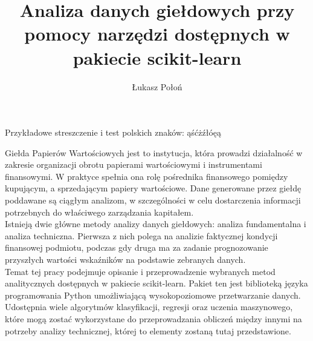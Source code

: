 \documentclass[man,mfi|min|mpt|mok|mub|mza|miz|bsp]{mgrwms}
\begin{document}
\title{Analiza danych giełdowych przy pomocy narzędzi dostępnych w pakiecie scikit-learn}
\author{Łukasz Połoń}
\maketitle
\tableofcontents
\begin{streszczenie}
Przykładowe streszczenie i test polskich znaków: ąśćżźłóęą

%
%
\end{streszczenie}
\begin{abstract}
%
%
\end{abstract}
\begin{wstep}[Wprowadzenie]  %
Giełda Papierów Wartościowych jest to instytucja, która prowadzi działalność w zakresie organizacji obrotu papierami wartościowymi i instrumentami finansowymi\cite{gpw}.
W praktyce spełnia ona rolę pośrednika finansowego pomiędzy kupującym, a sprzedającym papiery wartościowe.
Dane generowane przez giełdę poddawane są ciągłym analizom, w szczególności w celu dostarczenia informacji potrzebnych do właściwego zarządzania kapitałem.\\
Istnieją dwie główne metody analizy danych giełdowych: analiza fundamentalna i analiza techniczna\cite{basics_of_tech_analysis}.
Pierwsza z nich polega na analizie faktycznej kondycji finansowej podmiotu, podczas gdy druga ma za zadanie prognozowanie przyszłych wartości wskaźników na podstawie zebranych danych.\\

Temat tej pracy podejmuje opisanie i przeprowadzenie wybranych metod analitycznych dostępnych w pakiecie scikit-learn. Pakiet ten jest biblioteką języka programowania Python umożliwiającą wysokopoziomowe przetwarzanie danych.
Udostępnia wiele algorytmów klasyfikacji, regresji oraz uczenia maszynowego, które mogą zostać wykorzystane do przeprowadzania obliczeń między innymi na potrzeby analizy technicznej, której to elementy zostaną tutaj przedstawione.

\end{wstep}
\end{document}
